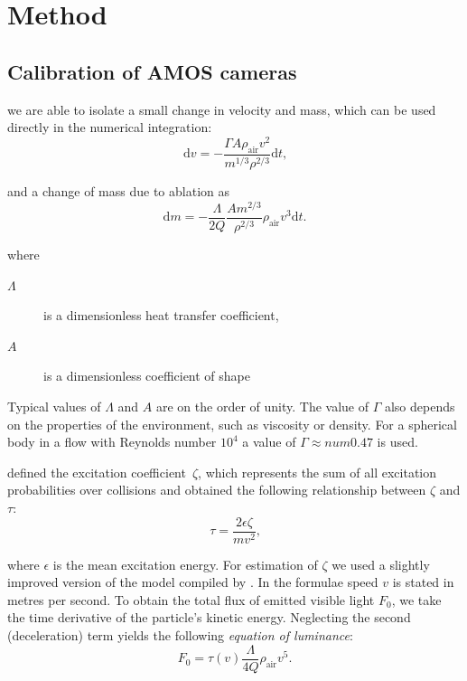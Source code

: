 




\section{Method}

    \subsection{Calibration of AMOS cameras}

    we are able to isolate a small change in velocity
    and mass, which can be used directly in the numerical integration:
    \begin{equation}
        \mathrm{d}v = -\frac{\Gamma A \rho_{\mathrm{air}} v^2}{m^{1/3} \rho^{2/3}} \mathrm{d}t\text{,}
        \label{eq:mc-dv}
    \end{equation}
    
    and a change of mass due to ablation as
    \begin{equation}
        \mathrm{d}m = -\frac{\Lambda}{2Q} \frac{Am^{2/3}}{\rho^{2/3}} \rho_{\mathrm{air}} v^3 \mathrm{d}t\text{.}
        \label{eq:mc-dm}
    \end{equation}
    
    where
    \begin{description}
        \item[$\Lambda$] is a dimensionless heat transfer coefficient,
        \item[$A$] is a dimensionless coefficient of shape
    \end{description}
    
    Typical values of $\Lambda$ and $A$ are on the order of unity. The value of $\Gamma$ also depends on the properties 
    of the environment, such as viscosity or density.
    For a spherical body in a flow with Reynolds number $10^4$ a value of $\Gamma \approx num{0.47}$ is used.
    
    \cite{jones-halliday2001} defined the excitation coefficient~$\zeta$, which represents
    the sum of all excitation probabilities over collisions and obtained the following relationship between $\zeta$ and $\tau$:
    \begin{equation}
        \tau = \frac{2\epsilon\zeta}{mv^2}\text{,}
        \label{m-tau}
    \end{equation}

    where $\epsilon$ is the mean excitation energy. For estimation of $\zeta$ we used a slightly improved version of the
    model compiled by \cite{hill2005}. In the formulae speed $v$ is stated in metres per second.
    To obtain the total flux of emitted visible light $F_0$, we take the time derivative of the particle's kinetic energy.
    Neglecting the second (deceleration) term yields the following \emph{equation of luminance}:
    \begin{equation}
        F_0 = \tau(v) \frac{\Lambda}{4Q} \rho_{\mathrm{air}} v^5\text{.}
        \label{m-f0}
    \end{equation}


